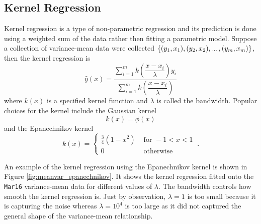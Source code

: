 \subsection{Kernel Regression}

Kernel regression \citep{friedman2001elements} is a type of non-parametric regression and its prediction is done using a weighted sum of the data rather then fitting a parametric model. Suppose a collection of variance-mean data were collected $\{(y_1,x_1),(y_2,x_2),\dotdotdot,(y_m,x_m)\}$, then the kernel regression is
\begin{equation}
    \widehat{y}(x)=
    \dfrac{
        \sum_{i=1}^m k\left(\dfrac{x-x_i}{\lambda}\right) y_i
    }
    {
        \sum_{i=1}^m k\left(\dfrac{x-x_i}{\lambda}\right)
    }
\end{equation}
where $k(x)$ is a specified kernel function and $\lambda$ is called the bandwidth. Popular choices for the kernel include the Gaussian kernel \citep{friedman2001elements}
\begin{equation}
    k(x)=\phi(x)
\end{equation}
and the Epanechnikov kernel \citep{friedman2001elements}
\begin{equation}
    k(x) = 
    \begin{cases}
        \frac{3}{4}\left(1-x^2\right)& \text{ for } -1<x<1 \\ 
        0 & \text{ otherwise } 
    \end{cases}
    \ .
\end{equation}

An example of the kernel regression using the Epanechnikov kernel is shown in Figure \ref{fig:meanvar_epanechnikov}. It shows the kernel regression fitted onto the \texttt{Mar16} variance-mean data for different values of $\lambda$. The bandwidth controls how smooth the kernel regression is. Just by observation, $\lambda=1$ is too small because it is capturing the noise whereas $\lambda=10^4$ is too large as it did not captured the general shape of the variance-mean relationship.

